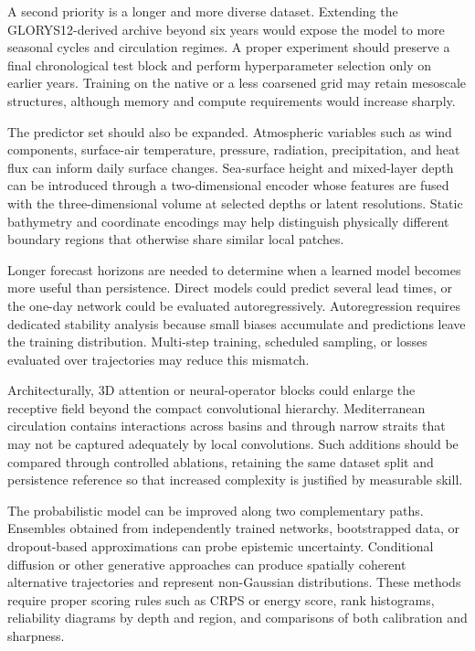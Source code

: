 A second priority is a longer and more diverse dataset. Extending the GLORYS12-derived archive beyond six years would expose the model to more seasonal cycles and circulation regimes. A proper experiment should preserve a final chronological test block and perform hyperparameter selection only on earlier years. Training on the native or a less coarsened grid may retain mesoscale structures, although memory and compute requirements would increase sharply.

The predictor set should also be expanded. Atmospheric variables such as wind components, surface-air temperature, pressure, radiation, precipitation, and heat flux can inform daily surface changes. Sea-surface height and mixed-layer depth can be introduced through a two-dimensional encoder whose features are fused with the three-dimensional volume at selected depths or latent resolutions. Static bathymetry and coordinate encodings may help distinguish physically different boundary regions that otherwise share similar local patches.

Longer forecast horizons are needed to determine when a learned model becomes more useful than persistence. Direct models could predict several lead times, or the one-day network could be evaluated autoregressively. Autoregression requires dedicated stability analysis because small biases accumulate and predictions leave the training distribution. Multi-step training, scheduled sampling, or losses evaluated over trajectories may reduce this mismatch.

Architecturally, 3D attention or neural-operator blocks could enlarge the receptive field beyond the compact convolutional hierarchy. Mediterranean circulation contains interactions across basins and through narrow straits that may not be captured adequately by local convolutions. Such additions should be compared through controlled ablations, retaining the same dataset split and persistence reference so that increased complexity is justified by measurable skill.

The probabilistic model can be improved along two complementary paths. Ensembles obtained from independently trained networks, bootstrapped data, or dropout-based approximations can probe epistemic uncertainty. Conditional diffusion or other generative approaches can produce spatially coherent alternative trajectories and represent non-Gaussian distributions. These methods require proper scoring rules such as CRPS or energy score, rank histograms, reliability diagrams by depth and region, and comparisons of both calibration and sharpness.

